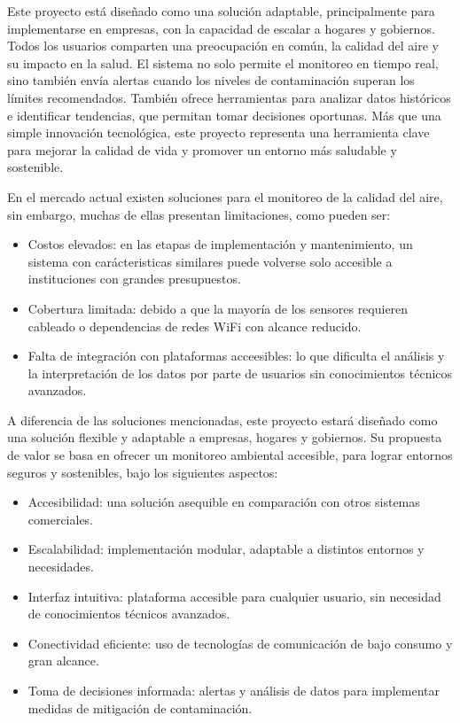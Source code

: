\documentclass[
11pt, %
]{charter}
\begin{document}
Este proyecto está diseñado como una solución adaptable, principalmente para implementarse en empresas, con la capacidad de escalar a hogares y gobiernos. Todos los usuarios comparten una preocupación en común, la calidad del aire y su impacto en la salud. El sistema no solo permite el monitoreo en tiempo real, sino también envía alertas cuando los niveles de contaminación superan los límites recomendados. También ofrece herramientas para analizar datos históricos e identificar tendencias, que permitan tomar decisiones oportunas. Más que una simple innovación tecnológica, este proyecto representa una herramienta clave para mejorar la calidad de vida y promover un entorno más saludable y sostenible.

En el mercado actual existen soluciones para el monitoreo de la calidad del aire, sin embargo, muchas de ellas presentan limitaciones, como pueden ser:
\begin{itemize}
	\item Costos elevados: en las etapas de implementación y mantenimiento, un sistema con carácteristicas similares puede volverse solo accesible a instituciones con grandes presupuestos.
	\item Cobertura limitada: debido a que la mayoría de los sensores requieren cableado o dependencias de redes WiFi con alcance reducido.
	\item Falta de integración con plataformas acceesibles: lo que dificulta el análisis y la interpretación de los datos por parte de usuarios sin conocimientos técnicos avanzados.
\end{itemize}

A diferencia de las soluciones mencionadas, este proyecto estará diseñado como una solución flexible y adaptable a  empresas, hogares y gobiernos. Su propuesta de valor se basa en ofrecer un monitoreo ambiental accesible, para lograr entornos seguros y sostenibles, bajo los siguientes aspectos:

\begin{itemize}
	\item Accesibilidad: una solución asequible en comparación con otros sistemas comerciales.
	\item Escalabilidad: implementación modular, adaptable a distintos entornos y necesidades.
	\item Interfaz intuitiva: plataforma accesible para cualquier usuario, sin necesidad de conocimientos técnicos avanzados.
	\item Conectividad eficiente: uso de tecnologías de comunicación de bajo consumo y gran alcance.
	\item Toma de decisiones informada: alertas y análisis de datos para implementar medidas de mitigación de contaminación.
\end{itemize}
\end{document}
